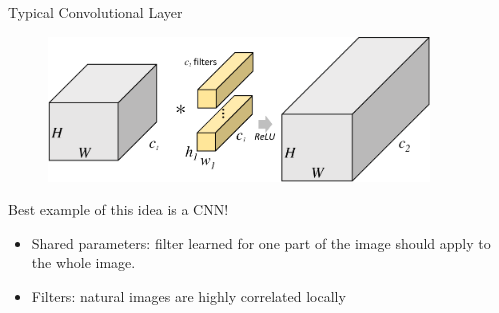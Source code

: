 \documentclass[t,xcolor=dvipsnames]{beamer}
\begin{document}
\begin{frame}{Typical Convolutional Layer}
\begin{figure}
   \includegraphics[width=0.9\textwidth, page=1]{../Figs/PDF/groupfig}
\end{figure}
    Best example of this idea is a CNN!
    \begin{itemize}
        \item Shared parameters: filter learned for one part of the image should apply to the whole image.
        \item Filters: natural images are highly correlated locally
    \end{itemize}

\end{frame}
\end{document}
